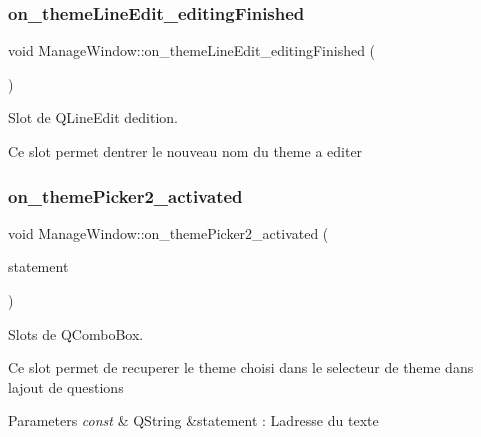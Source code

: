 \subsubsection{\texorpdfstring{on\+\_\+theme\+Line\+Edit\+\_\+editing\+Finished}{on\_themeLineEdit\_editingFinished}}
{\footnotesize\ttfamily void Manage\+Window\+::on\+\_\+theme\+Line\+Edit\+\_\+editing\+Finished (\begin{DoxyParamCaption}{ }\end{DoxyParamCaption})\hspace{0.3cm}{\ttfamily [slot]}}



Slot de Q\+Line\+Edit d\textquotesingle{}edition. 

Ce slot permet d\textquotesingle{}entrer le nouveau nom du theme a editer \mbox{\label{classManageWindow_a57fb9a37381bb5498c55b719a258d869}} 
\subsubsection{\texorpdfstring{on\+\_\+theme\+Picker2\+\_\+activated}{on\_themePicker2\_activated}}
{\footnotesize\ttfamily void Manage\+Window\+::on\+\_\+theme\+Picker2\+\_\+activated (\begin{DoxyParamCaption}\item[{const Q\+String \&}]{statement }\end{DoxyParamCaption})\hspace{0.3cm}{\ttfamily [slot]}}



Slots de Q\+Combo\+Box. 

Ce slot permet de recuperer le theme choisi dans le selecteur de theme dans l\textquotesingle{}ajout de questions 
\begin{DoxyParams}{Parameters}
{\em const} & Q\+String \&statement \+: L\textquotesingle{}adresse du texte \\
\hline
\end{DoxyParams}
\mbox{\label{classManageWindow_a125df0273d83768ef398e20b95dc1f27}} 
